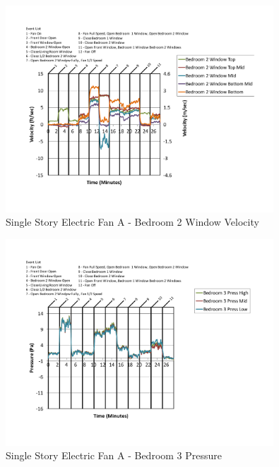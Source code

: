 \documentclass{article}
\begin{document}
\begin{appendices}
	\begin{figure}[H]
		\centering
		\includegraphics[height=3.05in,trim=0.67in 1.1in 0.67in 0.8in,clip=true]{0_Images/Results_Charts/ColdFlow/Single_Story/Electric/A/Bedroom_2_Window_Velocity.pdf}
		\caption{Single Story Electric Fan A - Bedroom 2 Window Velocity}
	\end{figure}
 

	\begin{figure}[H]
		\centering
		\includegraphics[height=3.05in,trim=0.67in 1.1in 0.67in 0.8in,clip=true]{0_Images/Results_Charts/ColdFlow/Single_Story/Electric/A/Bedroom_3_Pressure.pdf}
		\caption{Single Story Electric Fan A - Bedroom 3 Pressure}
	\end{figure}
 
	\clearpage


\end{appendices}
\end{document}

